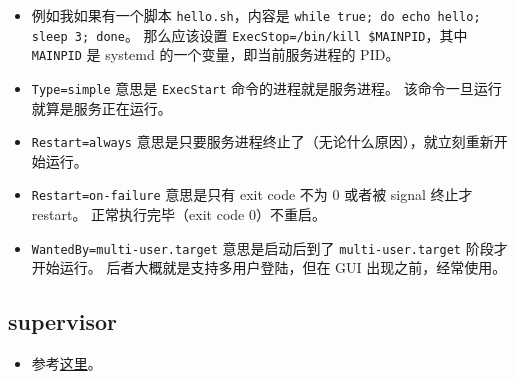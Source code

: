 \begin{itemize}
\item 例如我如果有一个脚本 \verb`hello.sh`，内容是 \verb`while true; do echo hello; sleep 3; done`。 那么应该设置 \verb`ExecStop=/bin/kill $MAINPID`，其中 \verb`MAINPID` 是 systemd 的一个变量，即当前服务进程的 PID。
\item \verb`Type=simple` 意思是 \verb`ExecStart` 命令的进程就是服务进程。 该命令一旦运行就算是服务正在运行。
\item \verb`Restart=always` 意思是只要服务进程终止了（无论什么原因），就立刻重新开始运行。
\item \verb`Restart=on-failure` 意思是只有 exit code 不为 0 或者被 signal 终止才 restart。 正常执行完毕（exit code 0）不重启。
\item \verb`WantedBy=multi-user.target` 意思是启动后到了 \verb`multi-user.target` 阶段才开始运行。 后者大概就是支持多用户登陆，但在 GUI 出现之前，经常使用。
\end{itemize}

\subsection{supervisor}
\begin{itemize}
\item 参考\href{https://www.digitalocean.com/community/tutorials/how-to-install-and-manage-supervisor-on-ubuntu-and-debian-vps}{这里}。
\end{itemize}
